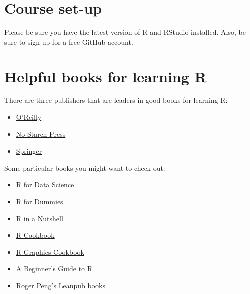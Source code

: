 \documentclass[]{book}
\providecommand{\tightlist}{%
  \setlength{\itemsep}{0pt}\setlength{\parskip}{0pt}}
\begin{document}
\section{Course set-up}\label{course-set-up}

Please be sure you have the latest version of R and RStudio installed.
Also, be sure to sign up for a free GitHub account.

\section{Helpful books for learning
R}\label{helpful-books-for-learning-r}

There are three publishers that are leaders in good books for learning
R:

\begin{itemize}
\tightlist
\item
  \href{http://shop.oreilly.com/category/browse-subjects/programming/r.do?sortby=publicationDate\&page=all}{O'Reilly}
\item
  \href{https://www.nostarch.com}{No Starch Press}
\item
  \href{http://www.springer.com/generic/search/results?SGWID=4-40109-24-653415-0\&sortOrder=relevance\&searchType=ADVANCED_CDA\&language=en\&searchScope=editions\&resultStart=1\&queryText=\%22+R+\%22}{Springer}
\end{itemize}

Some particular books you might want to check out:

\begin{itemize}
\tightlist
\item
  \href{http://r4ds.had.co.nz}{R for Data Science}
\item
  \href{http://discovery.library.colostate.edu/Record/.b40129810}{R for
  Dummies}
\item
  \href{http://discovery.library.colostate.edu/Record/.b40438880}{R in a
  Nutshell}
\item
  \href{http://discovery.library.colostate.edu/Record/.b36840282}{R
  Cookbook}
\item
  \href{http://www.amazon.com/R-Graphics-Cookbook-Winston-Chang/dp/1449316956/ref=sr_1_1?ie=UTF8\&qid=1440997472\&sr=8-1\&keywords=r+graphics+cookbook}{R
  Graphics Cookbook}
\item
  \href{http://discovery.library.colostate.edu/Record/.b44709365}{A
  Beginner's Guide to R}
\item
  \href{https://leanpub.com/u/rdpeng}{Roger Peng's Leanpub books}
\end{itemize}
\end{document}

